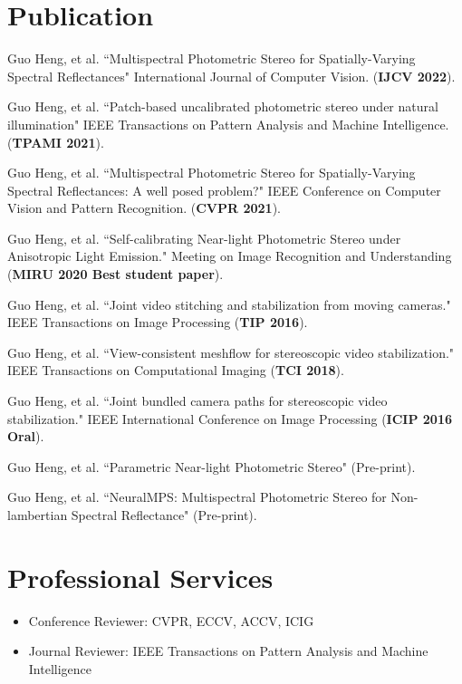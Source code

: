 \documentclass[letterpaper,11pt]{article}
\begin{document}
\section{Publication}
\begin{enumerate}[label={[\arabic*]}]
	\item Guo Heng, et al. ``Multispectral Photometric Stereo for Spatially-Varying Spectral Reflectances" International Journal of Computer Vision. (\textbf{IJCV 2022}). 
	\item Guo Heng, et al. ``Patch-based uncalibrated photometric stereo under natural illumination" 
	IEEE Transactions on Pattern Analysis and Machine Intelligence. (\textbf{TPAMI 2021}). 
	\item Guo Heng, et al. ``Multispectral Photometric Stereo for Spatially-Varying Spectral Reflectances: A well posed problem?" IEEE Conference on Computer Vision and Pattern Recognition. (\textbf{CVPR 2021}). 
	\item Guo Heng, et al. ``Self-calibrating Near-light Photometric Stereo under Anisotropic Light Emission." Meeting on Image Recognition and Understanding (\textbf{MIRU 2020 Best student paper}).  
	\item Guo Heng, et al. ``Joint video stitching and stabilization from moving cameras." IEEE Transactions on Image Processing (\textbf{TIP 2016}).
	\item Guo Heng, et al. ``View-consistent meshflow for stereoscopic video stabilization." IEEE Transactions on Computational Imaging (\textbf{TCI 2018}).
	\item Guo Heng, et al. ``Joint bundled camera paths for stereoscopic video stabilization." IEEE International Conference on Image Processing (\textbf{ICIP 2016 Oral}).
	\item Guo Heng, et al. ``Parametric Near-light Photometric Stereo" (Pre-print). 
	\item Guo Heng, et al. ``NeuralMPS: Multispectral Photometric Stereo for Non-lambertian Spectral Reflectance" (Pre-print). 
\end{enumerate}


%
\section{Professional Services}
\begin{itemize}
	\item Conference Reviewer: CVPR, ECCV, ACCV, ICIG
	\item Journal Reviewer: IEEE Transactions on Pattern Analysis and Machine Intelligence
\end{itemize} 


\end{document}
